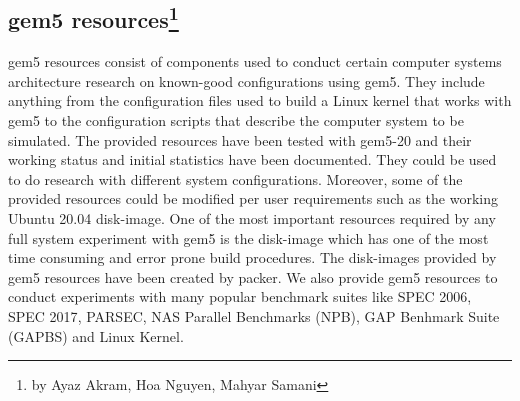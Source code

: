\subsection[gem5 resources]{gem5 resources\footnote{by Ayaz Akram, Hoa Nguyen, Mahyar Samani}}

gem5 resources consist of components used to conduct certain computer systems architecture
research on known-good configurations using gem5. They include anything from the configuration
files used to build a Linux kernel that works with gem5 to the configuration scripts that
describe the computer system to be simulated. The provided resources have been tested with gem5-20
and their working status and initial statistics have been documented\cite{benchmark_status}\cite{resources-repo}.
They could be used to do research with different system configurations. Moreover, some of the
provided resources could be modified per user requirements such as the working Ubuntu 20.04 disk-image.
One of the most important resources required by any full system experiment with gem5 is the disk-image
which has one of the most time consuming and error prone build procedures. The disk-images provided by
gem5 resources have been created by packer. We also provide gem5 resources to conduct experiments with many
popular benchmark suites like SPEC 2006\cite{spec06}, SPEC 2017\cite{spec17}, PARSEC\cite{parsec},
NAS Parallel Benchmarks (NPB)\cite{npb}, GAP Benhmark Suite (GAPBS)\cite{gapbs} and Linux Kernel.